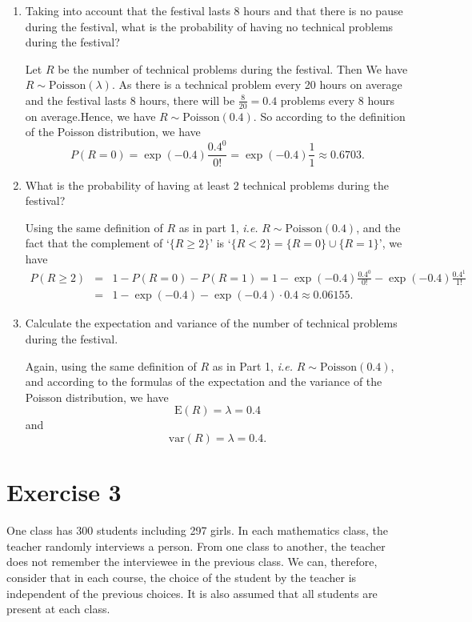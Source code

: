 \documentclass[12pt,thmsa]{article}
\begin{document}
\begin{enumerate}
\item Taking into account that the festival lasts 8 hours and that there is no pause during
the festival, what is the probability of having no technical problems during the
festival?

 Let $R$ be the number of technical problems during the festival. Then We have $R\sim \text{Poisson}(\lambda)$. As there is a technical problem every 20 hours on average and the festival lasts 8 hours, there will be $\frac{8}{20}=0.4$ problems every 8 hours on average.Hence, we have $R\sim \text{Poisson}(0.4)$. So according to the definition of the Poisson distribution, we have
\begin{equation*}
P(R=0)= \exp(-0.4)\frac{0.4^0}{0!} = \exp(-0.4) \frac{1}{1} \approx 0.6703.
\end{equation*}
\item What is the probability of having at least 2 technical problems during the festival?

Using the same definition of $R$ as in part 1, {\it i.e.} $R\sim  \text{Poisson}(0.4)$, and the fact that the complement of `$\{R\geq 2\}$' is `$\{R<2\}=\{R=0\}\cup\{R=1\}$', we have
\begin{eqnarray*}
P(R\geq 2)&=& 1- P(R=0) - P(R=1) = 1 - \exp(-0.4)\frac{0.4^0}{0!}- \exp(-0.4)\frac{0.4^1}{1!} \\
&=&  1 - \exp(-0.4) - \exp(-0.4) \cdot 0.4 \approx 0.06155.
\end{eqnarray*}
\item Calculate the expectation and variance of the number of technical problems during the
festival.

Again, using the same definition of $ R $ as in Part 1, {\it i.e.} $R\sim  \text{Poisson}(0.4)$, and according to the formulas of the expectation and the variance of the Poisson distribution, we have
$$
\text{E}(R) = \lambda= 0.4
$$
and
$$
\text{var}(R) =\lambda= 0.4.
$$

\end{enumerate}

\newpage

\section*{Exercise 3}

One class has 300 students including 297 girls. In each mathematics class, the
teacher randomly interviews a person. From one class to another, the teacher does not remember the interviewee in the previous class. We can, therefore, consider that in each course, the choice of the student by the teacher is independent of the previous choices. It is also assumed that all students are present at each class.
\end{document}
